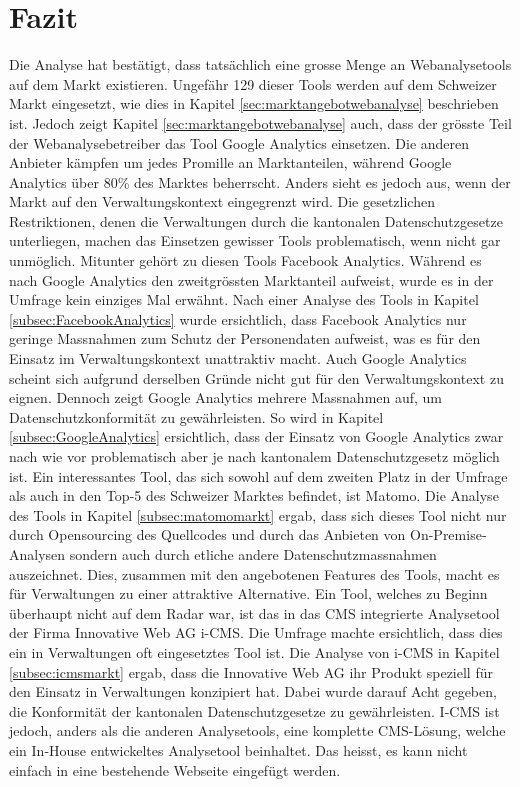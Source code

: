 \newpage

\section{Fazit}
Die Analyse hat bestätigt, dass tatsächlich eine grosse Menge an Webanalysetools auf dem Markt existieren. Ungefähr 129 dieser Tools werden auf dem Schweizer Markt eingesetzt, wie dies in Kapitel \ref{sec:marktangebotwebanalyse} beschrieben ist. Jedoch zeigt Kapitel \ref{sec:marktangebotwebanalyse} auch, dass der grösste Teil der Webanalysebetreiber das Tool Google Analytics einsetzen. Die anderen Anbieter kämpfen um jedes Promille an Marktanteilen, während Google Analytics über 80\% des Marktes beherrscht. Anders sieht es jedoch aus, wenn der Markt auf den Verwaltungskontext eingegrenzt wird. Die gesetzlichen Restriktionen, denen die Verwaltungen durch die kantonalen Datenschutzgesetze unterliegen, machen das Einsetzen gewisser Tools problematisch, wenn nicht gar unmöglich. Mitunter gehört zu diesen Tools Facebook Analytics. Während es nach Google Analytics den zweitgrössten Marktanteil aufweist, wurde es in der Umfrage kein einziges Mal erwähnt. Nach einer Analyse des Tools in Kapitel \ref{subsec:FacebookAnalytics} wurde ersichtlich, dass Facebook Analytics nur geringe Massnahmen zum Schutz der Personendaten aufweist, was es für den Einsatz im Verwaltungskontext unattraktiv macht. Auch Google Analytics scheint sich aufgrund derselben Gründe nicht gut für den Verwaltungskontext zu eignen. Dennoch zeigt Google Analytics mehrere Massnahmen auf, um Datenschutzkonformität zu gewährleisten. So wird in Kapitel \ref{subsec:GoogleAnalytics} ersichtlich, dass der Einsatz von Google Analytics zwar nach wie vor problematisch aber je nach kantonalem Datenschutzgesetz möglich ist. Ein interessantes Tool, das sich sowohl auf dem zweiten Platz in der Umfrage als auch in den Top-5 des Schweizer Marktes befindet, ist Matomo.
Die Analyse des Tools in Kapitel \ref{subsec:matomomarkt} ergab, dass sich dieses Tool nicht nur durch Opensourcing des Quellcodes und durch das Anbieten von On-Premise-Analysen sondern auch durch etliche andere Datenschutzmassnahmen auszeichnet. Dies, zusammen mit den angebotenen Features des Tools, macht es für Verwaltungen zu einer attraktive Alternative. Ein Tool, welches zu Beginn überhaupt nicht auf dem Radar war, ist das in das CMS integrierte Analysetool der Firma Innovative Web AG i-CMS. Die Umfrage machte ersichtlich, dass dies ein in Verwaltungen oft eingesetztes Tool ist. Die Analyse von i-CMS in Kapitel \ref{subsec:icmsmarkt} ergab, dass die Innovative Web AG ihr Produkt speziell für den Einsatz in Verwaltungen konzipiert hat. Dabei wurde darauf Acht gegeben, die Konformität der kantonalen Datenschutzgesetze zu gewährleisten. I-CMS ist jedoch, anders als die anderen Analysetools, eine komplette CMS-Lösung, welche ein In-House entwickeltes Analysetool beinhaltet. Das heisst, es kann nicht einfach in eine bestehende Webseite eingefügt werden. 

